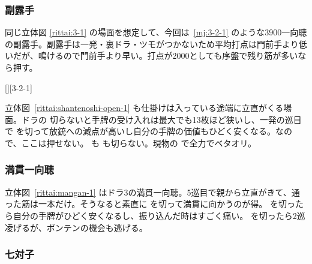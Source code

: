 \documentclass[../nankiru_main.tex]{subfiles}
\begin{document}
\subsubsection*{副露手}

同じ立体図 \ref{rittai:3-1} の場面を想定して、今回は~\ref{mj:3-2-1} のような3900一向聴の副露手。副露手は一発・裏ドラ・ツモがつかないため平均打点は門前手より低いだが、鳴けるので門前手より早い。打点が2000としても序盤で残り筋が多いなら押す\citep[][pp. 46--49]{tetsuoshi}。

[][3-2-1]

立体図~\ref{rittai:shantenoshi-open-1} も仕掛けは入っている途端に立直がくる場面。ドラの  切らないと手牌の受け入れは最大でも13枚ほど狭いし、一発の巡目で  を切って放銃への減点が高いし自分の手牌の価値もひどく安くなる。なので、ここは押せない。 も  も切らない。現物の  で全力でベタオリ\citep[][pp.~158--159]{fkt}。

\begin{rittai}[hbt]
  \centering
  \caption{}
  \label{rittai:shantenoshi-open-1}
\end{rittai}


\subsubsection*{満貫一向聴}

立体図~\ref{rittai:mangan-1} はドラ3の満貫一向聴。5巡目で親から立直がきて、通った筋は一本だけ。そうなると素直に  を切って満貫に向かうのが得。 を切ったら自分の手牌がひどく安くなるし、振り込んだ時はすごく痛い。 を切ったら2巡凌げるが、ポンテンの機会も逃げる\citep[][pp.~162--163]{fkt}。

\begin{rittai}[hbt]
  \centering
  \caption{}
  \label{rittai:mangan-1}
\end{rittai}


\subsubsection*{七対子}
\end{document}
